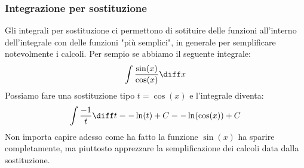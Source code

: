 \subsubsection{Integrazione per sostituzione}
Gli integrali per sostituzione ci permettono di sotituire delle funzioni 
all'interno dell'integrale con delle funzioni "più semplici", in generale per 
semplificare notevolmente i calcoli. Per sempio se abbiamo il seguente 
integrale:
\begin{equation*}
	\int \dfrac{\sin(x)}{\cos(x)} \diff x
\end{equation*}
Possiamo fare una sostituzione tipo $t = \cos(x)$ e l'integrale diventa:
\begin{equation*}
	\int \dfrac{-1}{t} \diff t = -\ln (t) + C = -\ln(\cos(x)) + C
\end{equation*}
Non importa capire adesso come ha fatto la funzione $\sin(x)$ ha sparire 
completamente, ma piuttosto apprezzare la semplificazione dei calcoli data 
dalla sostituzione.

